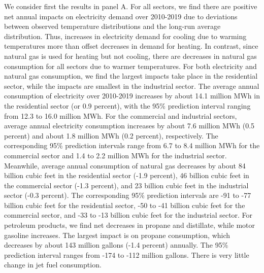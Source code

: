 \documentclass[11pt]{article}
\begin{document}
We consider first the results in panel A. For all sectors, we find there are positive net annual impacts on electricity demand over 2010-2019 due to deviations between observed temperature distributions and the long-run average distribution. Thus, increases in electricity demand for cooling due to warming temperatures more than offset decreases in demand for heating. In contrast, since natural gas is used for heating but not cooling, there are decreases in natural gas consumption for all sectors due to warmer temperatures. For both electricity and natural gas consumption, we find the largest impacts take place in the residential sector, while the impacts are smallest in the industrial sector. The average annual consumption of electricity over 2010-2019 increases by about 14.1 million MWh in the residential sector (or 0.9 percent), with the 95\% prediction interval ranging from 12.3 to 16.0 million MWh. For the commercial and industrial sectors, average annual electricity consumption increases by about 7.6 million MWh (0.5 percent) and about 1.8 million MWh (0.2 percent), respectively. The corresponding 95\% prediction intervals range from 6.7 to 8.4 million MWh for the commercial sector and 1.4 to 2.2 million MWh for the industrial sector. Meanwhile, average annual consumption of natural gas decreases by about 84 billion cubic feet in the residential sector (-1.9 percent), 46 billion cubic feet in the commercial sector (-1.3 percent), and 23 billion cubic feet in the industrial sector (-0.3 percent). The corresponding 95\% prediction intervals are -91 to -77 billion cubic feet for the residential sector, -50 to -41 billion cubic feet for the commercial sector, and -33 to -13 billion cubic feet for the industrial sector. For petroleum products, we find net decreases in propane and distillate, while motor gasoline increases. The largest impact is on propane consumption, which decreases by about 143 million gallons (-1.4 percent) annually. The 95\% prediction interval ranges from -174 to -112 million gallons. There is very little change in jet fuel consumption.
\end{document}

